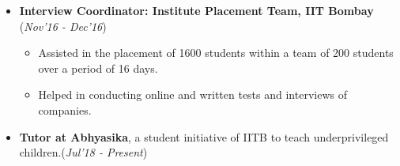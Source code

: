 \documentclass[10pt]{article}
\begin{document}
\begin{itemize}[leftmargin=0.4cm]
\item \textbf{Interview Coordinator: Institute Placement Team, IIT Bombay}
\hfill{(\textit{Nov'16 - Dec'16})}\\[-0.6cm]
    \begin{itemize}
            \item Assisted in the placement of 1600 students within a team of 200 students over a period of 16 days.\vspace{-0.1cm}
            \item Helped in conducting online and written tests and interviews of companies.
		\end{itemize}
		\vspace{-0.25cm}	


\item \textbf{Tutor at Abhyasika}, a student initiative of IITB to teach underprivileged children.\hfill{(\textit{Jul'18 - Present})}\vspace{-0.2cm}
    	
\end{itemize}
\vspace{0.15cm}
\end{document}

